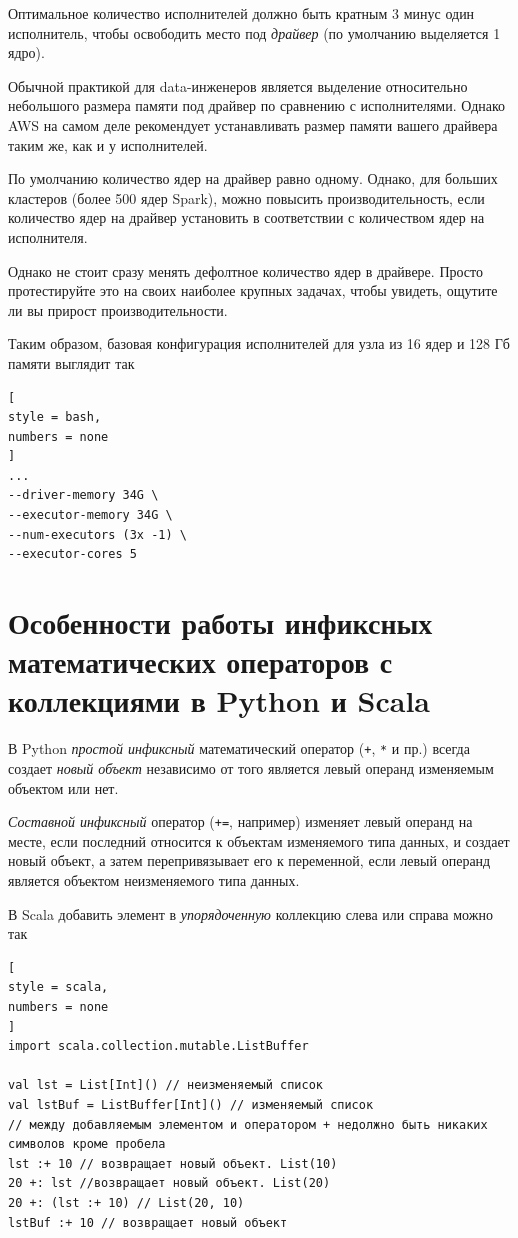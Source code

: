 \documentclass[%
	11pt,
	a4paper,
	utf8,
		]{article}
\begin{document}
Оптимальное количество исполнителей должно быть кратным 3 минус один исполнитель, чтобы освободить место под \emph{драйвер} (по умолчанию выделяется 1 ядро).

Обычной практикой для data-инженеров является выделение относительно небольшого размера памяти под драйвер по сравнению с исполнителями. Однако AWS на самом деле рекомендует устанавливать размер памяти вашего драйвера таким же, как и у исполнителей.

По умолчанию количество ядер на драйвер равно одному. Однако, для больших кластеров (более 500 ядер Spark), можно повысить производительность, если количество ядер на драйвер установить в соответствии с количеством ядер на исполнителя. 

Однако не стоит сразу менять дефолтное количество ядер в драйвере. Просто протестируйте это на своих наиболее крупных задачах, чтобы увидеть, ощутите ли вы прирост производительности.

Таким образом, базовая конфигурация исполнителей для узла из 16 ядер и 128 Гб памяти выглядит так
\begin{lstlisting}[
style = bash,
numbers = none	
]
...
--driver-memory 34G \
--executor-memory 34G \
--num-executors (3x -1) \
--executor-cores 5
\end{lstlisting}





\section{Особенности работы инфиксных математических операторов с коллекциями в Python и Scala}

В Python \emph{простой инфиксный} математический оператор (\texttt{+}, \texttt{*} и пр.) всегда создает \emph{новый объект} независимо от того является левый операнд изменяемым объектом или нет.

\emph{Составной инфиксный} оператор (\texttt{+=}, например) изменяет левый операнд на месте, если последний относится к объектам изменяемого типа данных, и создает новый объект, а затем перепривязывает его к переменной, если левый операнд является объектом неизменяемого типа данных.

В Scala добавить элемент в \emph{упорядоченную} коллекцию слева или справа можно так
\begin{lstlisting}[
style = scala,
numbers = none	
]
import scala.collection.mutable.ListBuffer

val lst = List[Int]() // неизменяемый список
val lstBuf = ListBuffer[Int]() // изменяемый список
// между добавляемым элементом и оператором + недолжно быть никаких символов кроме пробела
lst :+ 10 // возвращает новый объект. List(10)
20 +: lst //возвращает новый объект. List(20)
20 +: (lst :+ 10) // List(20, 10)
lstBuf :+ 10 // возвращает новый объект
\end{lstlisting}
\end{document}

